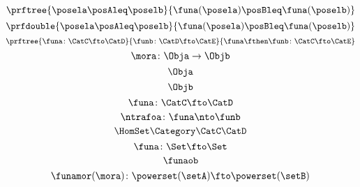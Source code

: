 {\begin{forslides}
        \begin{equation}
            \label{eq:mono2}
            \prftree{\posela \posAleq \poselb}{\funa(\posela) \posBleq \funa(\poselb)}
        \end{equation}
        \begin{equation}
            \label{eq:mono3}
            \prfdouble{\posela \posAleq \poselb}{\funa(\posela) \posBleq \funa(\poselb)}
        \end{equation}
        \begin{equation}
            \label{eq:functor-composition1}
            \prftree{\funa\colon \CatC \fto \CatD}{\funb\colon\CatD\fto\CatE}{\funa\fthen\funb\colon \CatC \fto \CatE}
        \end{equation}
        \begin{equation}
            \label{eq:slides_mora}
            \mora\colon \Obja\to\Objb
        \end{equation}
        \begin{equation}
            \label{eq:slides_mora_obja}
            \Obja
        \end{equation}
        \begin{equation}
            \label{eq:slides_mora_objb}
            \Objb
        \end{equation}
        \begin{equation}
            \label{eq:slides_funa}
            \funa\colon\CatC\fto\CatD
        \end{equation}
        \begin{equation}
            \label{eq:slides_ntrafoa}
            \ntrafoa\colon\funa\nto\funb
        \end{equation}
        \begin{equation}
            \label{eq:slides_hom}
            \HomSet\Category\CatC\CatD
        \end{equation}
        \begin{equation}
            \label{eq:pow_fun_1}
            \funa\colon \Set \fto \Set
        \end{equation}
        \begin{equation}
            \label{eq:pow_fun_2}
            \funaob
        \end{equation}
        \begin{equation}
            \label{eq:pow_fun_3}
            \begin{aligned}
                \funamor(\mora)\colon \powerset(\setA) & \fto \powerset(\setB)                              \\

\end{aligned}
\end{equation}
\end{forslides}}
